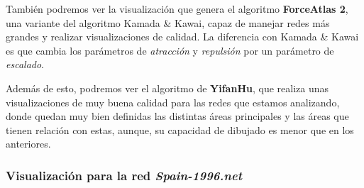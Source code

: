 \documentclass[paper=a4, fontsize=11pt]{article} %
\numberwithin{equation}{section} %
\numberwithin{figure}{section} %
\numberwithin{table}{section} %
\begin{document}
También podremos ver la visualización que genera el algoritmo \textbf{ForceAtlas 2}, una variante del algoritmo Kamada \& Kawai, capaz de manejar redes más grandes y realizar visualizaciones de calidad. La diferencia con Kamada \& Kawai es que cambia los parámetros de \textit{atracción} y \textit{repulsión} por un parámetro de \textit{escalado}.

Además de esto, podremos ver el algoritmo de \textbf{YifanHu}, que realiza unas visualizaciones de muy buena calidad para las redes que estamos analizando, donde quedan muy bien definidas las distintas áreas principales y las áreas que tienen relación con estas, aunque, su capacidad de dibujado es menor que en los anteriores.

\subsubsection{Visualización para la red \textit{Spain-1996.net}}
\end{document}
